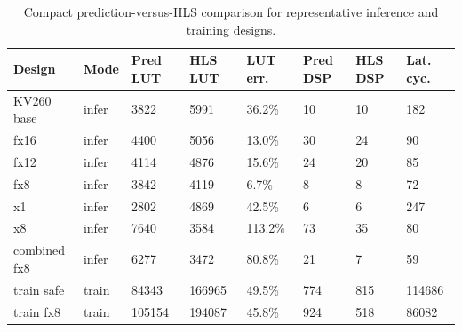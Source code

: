 \begin{table}[t]
\centering
\scriptsize
\setlength{\tabcolsep}{3pt}
\begin{tabular}{llllllll}
\hline
Design & Mode & Pred LUT & HLS LUT & LUT err. & Pred DSP & HLS DSP & Lat. cyc. \\
\hline
KV260 base & infer & 3822 & 5991 & 36.2\% & 10 & 10 & 182 \\
fx16 & infer & 4400 & 5056 & 13.0\% & 30 & 24 & 90 \\
fx12 & infer & 4114 & 4876 & 15.6\% & 24 & 20 & 85 \\
fx8 & infer & 3842 & 4119 & 6.7\% & 8 & 8 & 72 \\
x1 & infer & 2802 & 4869 & 42.5\% & 6 & 6 & 247 \\
x8 & infer & 7640 & 3584 & 113.2\% & 73 & 35 & 80 \\
combined fx8 & infer & 6277 & 3472 & 80.8\% & 21 & 7 & 59 \\
train safe & train & 84343 & 166965 & 49.5\% & 774 & 815 & 114686 \\
train fx8 & train & 105154 & 194087 & 45.8\% & 924 & 518 & 86082 \\
\hline
\end{tabular}
\caption{Compact prediction-versus-HLS comparison for representative inference and training designs.}
\label{tab:table\_arxiv\_prediction\_vs\_hls}
\end{table}
